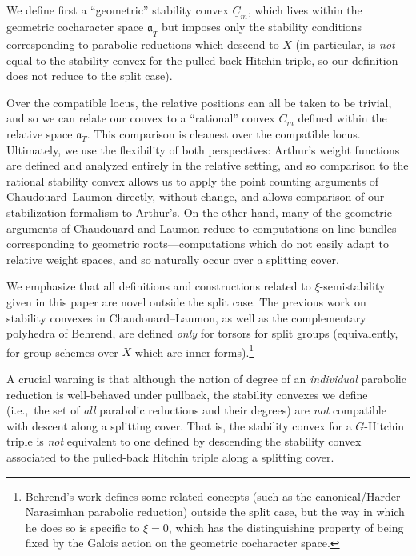 \documentclass[openany]{amsbook}
\theoremstyle{definition}
\theoremstyle{remark}
\numberwithin{equation}{section}
\newcommand{\ul}[1]{\underline{#1}}
\renewcommand{\-}{\operatorname{-}}
\renewcommand{\a}{\mathfrak{a}}
\newcommand{\ga}{\ul{\a}}
\begin{document}
We define first a ``geometric'' stability convex $\ul{C}_m$, which lives within the geometric cocharacter space $\ga_T$ but imposes only the stability conditions corresponding to parabolic reductions which descend to $X$ (in particular, is \textit{not} equal to the stability convex for the pulled-back Hitchin triple, so our definition does not reduce to the split case).

Over the compatible locus, the relative positions can all be taken to be trivial, and so we can relate our convex to a ``rational'' convex $C_m$ defined within the relative space $\a_T$. This comparison is cleanest over the compatible locus. Ultimately, we use the flexibility of both perspectives: Arthur's weight functions are defined and analyzed entirely in the relative setting, and so comparison to the rational stability convex allows us to apply the point counting arguments of Chaudouard--Laumon directly, without change, and allows comparison of our stabilization formalism to Arthur's.
On the other hand, many of the geometric arguments of Chaudouard and Laumon reduce to computations on line bundles corresponding to geometric roots---computations which do not easily adapt to relative weight spaces, and so naturally occur over a splitting cover. 

We emphasize that all definitions and constructions related to $\xi$-semistability given in this paper are novel outside the split case. The previous work on stability convexes in Chaudouard--Laumon, as well as the complementary polyhedra of Behrend, are defined \textit{only} for torsors for split groups (equivalently, for group schemes over $X$ which are inner forms).\footnote{Behrend's work defines some related concepts (such as the canonical/Harder--Narasimhan parabolic reduction) outside the split case, but the way in which he does so is specific to $\xi = 0$, which has the distinguishing property of being fixed by the Galois action on the geometric cocharacter space.}

A crucial warning is that although the notion of degree of an \textit{individual} parabolic reduction is well-behaved under pullback, the stability convexes we define (i.e.,\ the set of \textit{all} parabolic reductions and their degrees) are \textit{not} compatible with descent along a splitting cover. That is, the stability convex for a $G$-Hitchin triple is \textit{not} equivalent to one defined by descending the stability convex associated to the pulled-back Hitchin triple along a splitting cover. 
\end{document}
